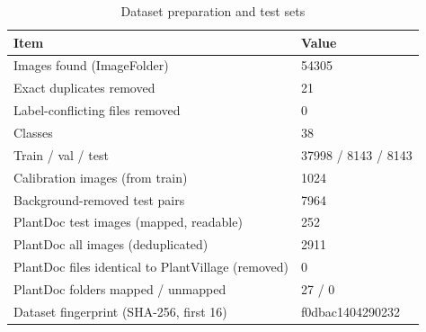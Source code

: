 \begin{table}[t]
\centering
\caption{Dataset preparation and test sets}
\label{tab:tab01_dataset}
\small
\begin{tabular}{ll}
\toprule
Item & Value \\
\midrule
Images found (ImageFolder) & 54305 \\
Exact duplicates removed & 21 \\
Label-conflicting files removed & 0 \\
Classes & 38 \\
Train / val / test & 37998 / 8143 / 8143 \\
Calibration images (from train) & 1024 \\
Background-removed test pairs & 7964 \\
PlantDoc test images (mapped, readable) & 252 \\
PlantDoc all images (deduplicated) & 2911 \\
PlantDoc files identical to PlantVillage (removed) & 0 \\
PlantDoc folders mapped / unmapped & 27 / 0 \\
Dataset fingerprint (SHA-256, first 16) & f0dbac1404290232 \\
\bottomrule
\end{tabular}
\end{table}
